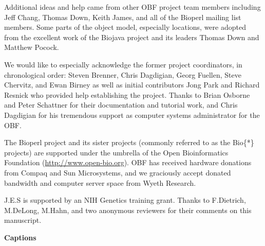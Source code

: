 \documentclass[12pt]{article}
\begin{document}
Additional ideas and help came from other OBF project team members
including Jeff Chang, Thomas Down, Keith James, and all of the Bioperl
mailing list members.  Some parts of the object model, especially
locations, were adopted from the excellent work of the Biojava project
and its leaders Thomas Down and Matthew Pocock.


% 
We would like to especially acknowledge the former project
coordinators, in chronological order: Steven Brenner, Chris Dagdigian,
Georg Fuellen, Steve Chervitz, and Ewan Birney as well as initial
contributors Jong Park and Richard Resnick who provided help
establishing the project.  Thanks to Brian Osborne and Peter Schattner
for their documentation and tutorial work, and Chris Dagdigian for his
tremendous support as computer systems administrator for the OBF.

The Bioperl project and its sister projects (commonly referred to as
the Bio\{*\} projects) are supported under the umbrella of the Open
Bioinformatics Foundation (\url{http://www.open-bio.org}).  OBF has
received hardware donations from Compaq and Sun Microsystems, and we
graciously accept donated bandwidth and computer server space from
Wyeth Research.

J.E.S is supported by an NIH Genetics training grant.  Thanks to
F.Dietrich, M.DeLong, M.Hahn, and two anonymous reviewers for their
comments on this manuscript.


 

\newpage

\begin{center}{\large \textbf{Captions}}\end{center}
\end{document}
